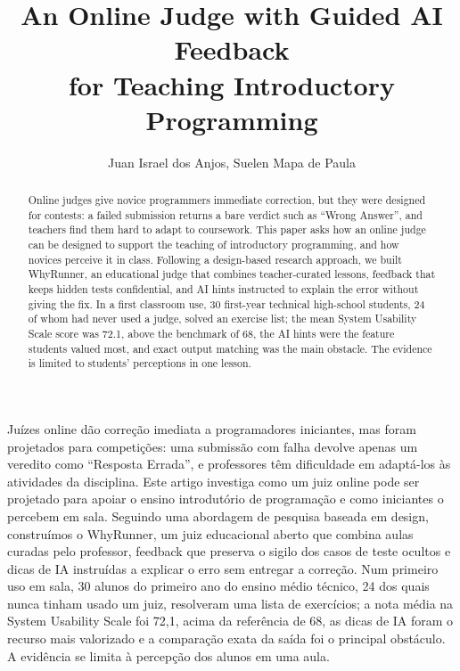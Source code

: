 \documentclass[12pt]{article}
\title{An Online Judge with Guided AI Feedback\\for Teaching Introductory Programming}
\author{Juan Israel dos Anjos, Suelen Mapa de Paula}
\begin{document}
\maketitle

\begin{abstract}
  Online judges give novice programmers immediate correction, but they were designed for contests: a failed submission returns a bare verdict such as ``Wrong Answer'', and teachers find them hard to adapt to coursework. This paper asks how an online judge can be designed to support the teaching of introductory programming, and how novices perceive it in class. Following a design-based research approach, we built WhyRunner, an educational judge that combines teacher-curated lessons, feedback that keeps hidden tests confidential, and AI hints instructed to explain the error without giving the fix. In a first classroom use, 30 first-year technical high-school students, 24 of whom had never used a judge, solved an exercise list; the mean System Usability Scale score was 72.1, above the benchmark of 68, the AI hints were the feature students valued most, and exact output matching was the main obstacle. The evidence is limited to students' perceptions in one lesson.
\end{abstract}

\begin{otherlanguage}{brazilian}
\begin{resumo}
  Juízes online dão correção imediata a programadores iniciantes, mas foram projetados para competições: uma submissão com falha devolve apenas um veredito como ``Resposta Errada'', e professores têm dificuldade em adaptá-los às atividades da disciplina. Este artigo investiga como um juiz online pode ser projetado para apoiar o ensino introdutório de programação e como iniciantes o percebem em sala. Seguindo uma abordagem de pesquisa baseada em design, construímos o WhyRunner, um juiz educacional aberto que combina aulas curadas pelo professor, feedback que preserva o sigilo dos casos de teste ocultos e dicas de IA instruídas a explicar o erro sem entregar a correção. Num primeiro uso em sala, 30 alunos do primeiro ano do ensino médio técnico, 24 dos quais nunca tinham usado um juiz, resolveram uma lista de exercícios; a nota média na System Usability Scale foi 72,1, acima da referência de 68, as dicas de IA foram o recurso mais valorizado e a comparação exata da saída foi o principal obstáculo. A evidência se limita à percepção dos alunos em uma aula.
\end{resumo}
\end{otherlanguage}
\end{document}
